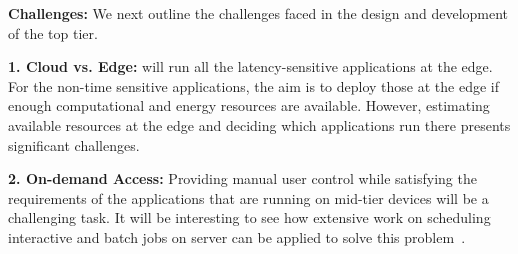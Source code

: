 \noindent\textbf{Challenges:} We next outline the challenges faced in the design and development of the \myname{} top tier.

\noindent\textbf{1. Cloud vs. Edge:} \myname{} will run all the latency-sensitive applications at the edge. For the non-time sensitive applications, the aim is to deploy those at the edge if enough computational and energy resources are available. However, estimating available resources at the edge and deciding which applications run there presents significant challenges.
    
\noindent\textbf{2. On-demand Access:} Providing manual user control while satisfying the requirements of the applications that are running on \myname{} mid-tier devices will be a challenging task. It will be interesting to see how extensive work on scheduling interactive and batch jobs on server can be applied to solve this problem~\cite{parallel-scheduling}.
    
    






